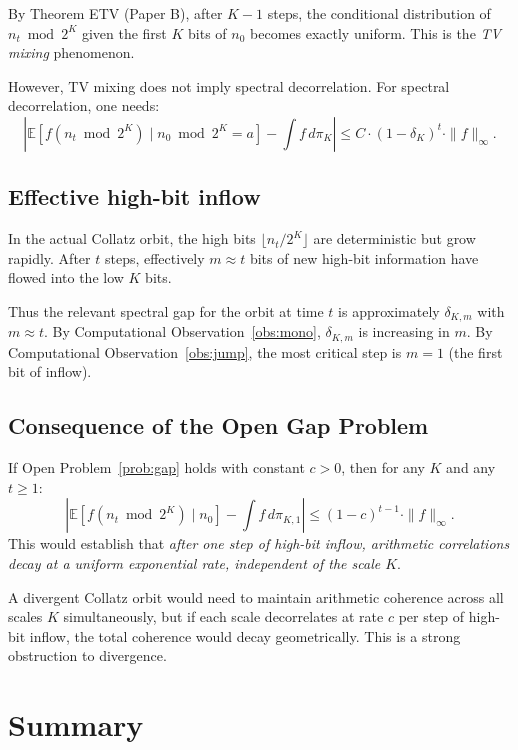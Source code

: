 \documentclass[12pt]{article}
\theoremstyle{definition}
\begin{document}
By Theorem ETV (Paper B), after $K-1$ steps, the conditional distribution of $n_t \bmod 2^K$ given the first $K$ bits of $n_0$ becomes exactly uniform. This is the \emph{TV mixing} phenomenon.

However, TV mixing does not imply spectral decorrelation. For spectral decorrelation, one needs:
\[
  \left|\mathbb{E}[f(n_t \bmod 2^K) \mid n_0 \bmod 2^K = a] - \int f\,d\pi_K\right| \leq C \cdot (1-\delta_K)^t \cdot \|f\|_\infty.
\]

\subsection{Effective high-bit inflow}

In the actual Collatz orbit, the high bits $\lfloor n_t/2^K \rfloor$ are deterministic but grow rapidly. After $t$ steps, effectively $m \approx t$ bits of new high-bit information have flowed into the low $K$ bits.

Thus the relevant spectral gap for the orbit at time $t$ is approximately $\delta_{K,m}$ with $m \approx t$. By Computational Observation~\ref{obs:mono}, $\delta_{K,m}$ is increasing in $m$. By Computational Observation~\ref{obs:jump}, the most critical step is $m=1$ (the first bit of inflow).

\subsection{Consequence of the Open Gap Problem}

If Open Problem~\ref{prob:gap} holds with constant $c > 0$, then for any $K$ and any $t \geq 1$:
\[
  \left|\mathbb{E}[f(n_t \bmod 2^K) \mid n_0] - \int f\,d\pi_{K,1}\right| \leq (1-c)^{t-1} \cdot \|f\|_\infty.
\]
This would establish that \emph{after one step of high-bit inflow, arithmetic correlations decay at a uniform exponential rate, independent of the scale $K$}.

A divergent Collatz orbit would need to maintain arithmetic coherence across all scales $K$ simultaneously, but if each scale decorrelates at rate $c$ per step of high-bit inflow, the total coherence would decay geometrically. This is a strong obstruction to divergence.

\section{Summary}
\end{document}
